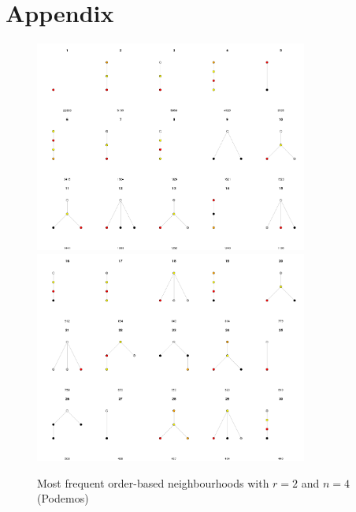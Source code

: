 \documentclass[conference]{IEEEtran}
\begin{document}
\section*{Appendix}
\begin{figure}
	\centering
	\includegraphics[width=0.8\textwidth]{census_orderbased_1}
	\includegraphics[width=0.8\textwidth]{census_orderbased_2}
	\caption{Most frequent order-based neighbourhoods with $r=2$ and $n=4$ (Podemos)}
	\label{fig:census_orderbased}
\end{figure}
\end{document}
